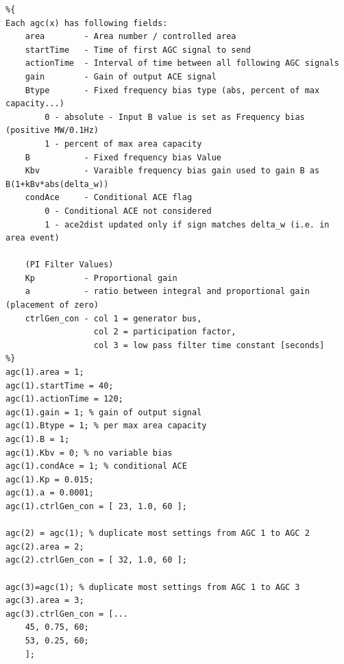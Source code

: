 \documentclass[12pt]{article}
\begin{document}
\begin{verbatim}
%{ 
Each agc(x) has following fields:
    area        - Area number / controlled area
    startTime   - Time of first AGC signal to send
    actionTime  - Interval of time between all following AGC signals
    gain        - Gain of output ACE signal
    Btype       - Fixed frequency bias type (abs, percent of max capacity...)
        0 - absolute - Input B value is set as Frequency bias (positive MW/0.1Hz)
        1 - percent of max area capacity
    B           - Fixed frequency bias Value
    Kbv         - Varaible frequency bias gain used to gain B as B(1+kBv*abs(delta_w))
    condAce     - Conditional ACE flag
        0 - Conditional ACE not considered
        1 - ace2dist updated only if sign matches delta_w (i.e. in area event)

    (PI Filter Values)
    Kp          - Proportional gain
    a           - ratio between integral and proportional gain (placement of zero)
    ctrlGen_con - col 1 = generator bus, 
                  col 2 = participation factor, 
                  col 3 = low pass filter time constant [seconds]
%}
agc(1).area = 1;
agc(1).startTime = 40;
agc(1).actionTime = 120;
agc(1).gain = 1; % gain of output signal
agc(1).Btype = 1; % per max area capacity
agc(1).B = 1;
agc(1).Kbv = 0; % no variable bias
agc(1).condAce = 1; % conditional ACE
agc(1).Kp = 0.015;
agc(1).a = 0.0001;
agc(1).ctrlGen_con = [ 23, 1.0, 60 ];

agc(2) = agc(1); % duplicate most settings from AGC 1 to AGC 2
agc(2).area = 2;
agc(2).ctrlGen_con = [ 32, 1.0, 60 ];

agc(3)=agc(1); % duplicate most settings from AGC 1 to AGC 3
agc(3).area = 3;
agc(3).ctrlGen_con = [...
    45, 0.75, 60;
    53, 0.25, 60;
    ];
\end{verbatim}
\end{document}
